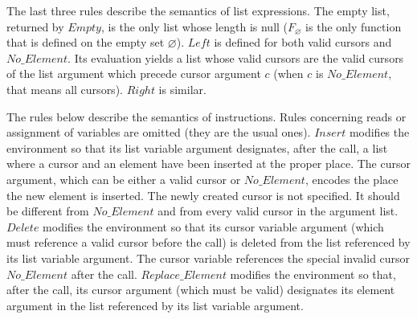 \documentclass[runningheads,a4paper]{llncs}
\newcommand{\Fv}{\ensuremath{\mathit{F}_{\varnothing}}\xspace}
\newcommand{\Insert}{\ensuremath{\mathit{Insert}}\xspace}
\newcommand{\Delete}{\ensuremath{\mathit{Delete}}\xspace}
\newcommand{\Replace}{\ensuremath{\mathit{Replace\_Element}}\xspace}
\newcommand{\Left}{\ensuremath{\mathit{Left}}\xspace}
\newcommand{\Right}{\ensuremath{\mathit{Right}}\xspace}
\newcommand{\Empty}{\ensuremath{\mathit{Empty}}\xspace}
\newcommand{\NoElement}{\ensuremath{\mathit{No\_Element}}\xspace}
\begin{document}
The last three rules describe the semantics of list expressions.  The empty
list, returned by $\Empty$, is the only list whose length is null
($\Fv$ is the only function that is defined on the empty set
$\varnothing$).  $\Left$ is defined for both valid cursors and
$\NoElement$. Its evaluation yields a list whose valid cursors are the valid
cursors of the list argument which precede cursor argument $c$ (when $c$ is
\NoElement, that means all cursors). \Right is similar.

The rules below describe the semantics of instructions.  Rules concerning reads
or assignment of variables are omitted (they are the usual ones). \Insert
modifies the environment so that its list variable argument designates, after
the call, a list where a cursor and an element have been inserted at the proper
place. The cursor argument, which can be either a valid cursor or \NoElement,
encodes the place the new element is inserted. The newly created cursor is not
specified. It should be different from \NoElement and from every valid cursor
in the argument list. \Delete modifies the environment so that its cursor
variable argument (which must reference a valid cursor before the call) is
deleted from the list referenced by its list variable argument. The cursor
variable references the special invalid cursor \NoElement after the call.
\Replace modifies the environment so that, after the call, its cursor argument
(which must be valid) designates its element argument in the list referenced by
its list variable argument.
\end{document}
